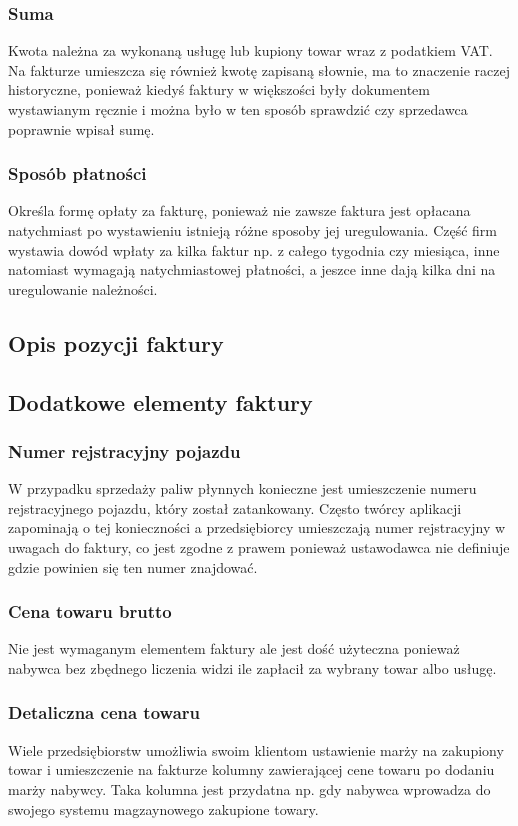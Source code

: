 \subsubsection{Suma}
Kwota należna za wykonaną usługę lub kupiony towar wraz z podatkiem VAT. Na
fakturze umieszcza się również kwotę zapisaną słownie, ma to znaczenie raczej
historyczne, ponieważ kiedyś faktury w większości były dokumentem wystawianym
ręcznie i można było w ten sposób sprawdzić czy sprzedawca poprawnie wpisał
sumę.
\subsubsection{Sposób płatności}
Określa formę opłaty za fakturę, ponieważ nie zawsze faktura jest opłacana
natychmiast po wystawieniu istnieją różne sposoby jej uregulowania. Część firm
wystawia dowód wpłaty za kilka faktur np. z całego tygodnia czy miesiąca, inne
natomiast wymagają natychmiastowej płatności, a jeszce inne dają kilka dni na
uregulowanie należności.
\subsection{Opis pozycji faktury}

\subsection{Dodatkowe elementy faktury}
\subsubsection{Numer rejstracyjny pojazdu}
W przypadku sprzedaży paliw płynnych konieczne jest umieszczenie numeru
rejstracyjnego pojazdu, który został zatankowany. Często twórcy aplikacji
zapominają o tej konieczności a przedsiębiorcy umieszczają numer rejstracyjny w
uwagach do faktury, co jest zgodne z prawem ponieważ ustawodawca nie definiuje
gdzie powinien się ten numer znajdować.
\subsubsection{Cena towaru brutto}
Nie jest wymaganym elementem faktury ale jest dość użyteczna ponieważ nabywca
bez zbędnego liczenia widzi ile zapłacił za wybrany towar albo usługę.
\subsubsection{Detaliczna cena towaru}
Wiele przedsiębiorstw umożliwia swoim klientom ustawienie marży na zakupiony
towar i umieszczenie na fakturze kolumny zawierającej cene towaru po dodaniu
marży nabywcy. Taka kolumna jest przydatna np. gdy nabywca wprowadza do swojego
systemu magzaynowego zakupione towary.
